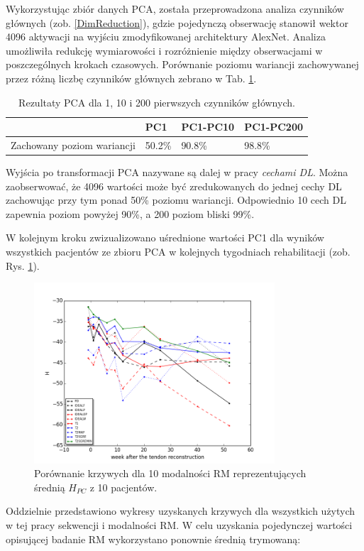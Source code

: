 Wykorzystując zbiór danych PCA, została przeprowadzona analiza czynników głównych (zob. \ref{DimReduction}), gdzie pojedynczą obserwację stanowił wektor 4096 aktywacji na wyjściu zmodyfikowanej architektury AlexNet. Analiza umożliwiła redukcję wymiarowości i rozróżnienie między obserwacjami w poszczególnych krokach czasowych. Porównanie poziomu wariancji zachowywanej przez różną liczbę czynników głównych zebrano w Tab. \ref{PCA-results}.
\begin{table}[h!]
 \setlength{\tabcolsep}{12pt}
 \centering
 \caption{Rezultaty PCA dla 1, 10 i 200 pierwszych czynników głównych.}
 \label{PCA-results}
 \begin{tabular}{l|l|l|l}
 \hline
 & PC1 & PC1-PC10 & PC1-PC200 \\ \hline
 Zachowany poziom wariancji & 50.2\% & 90.8\%   & 98.8\% \\ \hline 
 \end{tabular}
 \end{table}
Wyjścia po transformacji PCA nazywane są dalej w pracy \textit{cechami DL}. Można zaobserwować, że 4096 wartości może być zredukowanych do jednej cechy DL zachowując przy tym ponad 50\% poziomu wariancji. Odpowiednio 10 cech DL zapewnia poziom powyżej 90\%, a 200 poziom bliski 99\%. 

W kolejnym kroku zwizualizowano uśrednione wartości PC1 dla wyników wszystkich pacjentów ze zbioru PCA w kolejnych tygodniach rehabilitacji (zob. Rys. \ref{fig:H}).

\begin{figure}[h!]
	\centering
	\includegraphics[width=0.8\textwidth]{figures/H_PC1.png}
	\caption{Porównanie krzywych dla 10 modalności RM reprezentujących średnią $H_{PC}$ z 10 pacjentów.}\label{fig:H}
\end{figure}
Oddzielnie przedstawiono wykresy uzyskanych krzywych dla wszystkich użytych w tej pracy sekwencji i modalności RM. W celu uzyskania pojedynczej wartości opisującej badanie RM wykorzystano ponownie średnią trymowaną:

